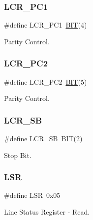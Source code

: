 \subsubsection{\texorpdfstring{L\+C\+R\+\_\+\+P\+C1}{LCR\_PC1}}
{\footnotesize\ttfamily \#define L\+C\+R\+\_\+\+P\+C1~\hyperlink{group___serial_ga3a8ea58898cb58fc96013383d39f482c}{B\+IT}(4)}



Parity Control. 

\hypertarget{group___serial_ga5e6060e38b2ad74954b34f6ac82b8a5b}{}\label{group___serial_ga5e6060e38b2ad74954b34f6ac82b8a5b} 
\subsubsection{\texorpdfstring{L\+C\+R\+\_\+\+P\+C2}{LCR\_PC2}}
{\footnotesize\ttfamily \#define L\+C\+R\+\_\+\+P\+C2~\hyperlink{group___serial_ga3a8ea58898cb58fc96013383d39f482c}{B\+IT}(5)}



Parity Control. 

\hypertarget{group___serial_ga9d59a56595a0f0c5af42cab8a9d3a656}{}\label{group___serial_ga9d59a56595a0f0c5af42cab8a9d3a656} 
\subsubsection{\texorpdfstring{L\+C\+R\+\_\+\+SB}{LCR\_SB}}
{\footnotesize\ttfamily \#define L\+C\+R\+\_\+\+SB~\hyperlink{group___serial_ga3a8ea58898cb58fc96013383d39f482c}{B\+IT}(2)}



Stop Bit. 

\hypertarget{group___serial_gad51d51aee21f6cc77d4955221aee3dcb}{}\label{group___serial_gad51d51aee21f6cc77d4955221aee3dcb} 
\subsubsection{\texorpdfstring{L\+SR}{LSR}}
{\footnotesize\ttfamily \#define L\+SR~0x05}



Line Status Register -\/ Read. 

\hypertarget{group___serial_ga0fa2f414cac085b768774f2881321b60}{}\label{group___serial_ga0fa2f414cac085b768774f2881321b60} 
